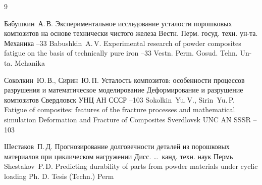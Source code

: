 \begin{thebibliography}{9}

\by Бабушкин~А.\,В.
\paper Экспериментальное исследование усталости порошковых композитов на основе технически чистого железа
\jour Вестн. Перм. госуд. техн. ун-та. Механика
--33
\misctransl
\by Babushkin~A.\,V.
\paper Experimental research of powder composites fatigue on the basis of technically pure iron
--33
\jour Vestn. Perm. Gosud. Tehn. Un-ta. Mehanika

\by Соколкин~Ю.\,В., Сирин~Ю.\,П.
\paper Усталость композитов: особенности процессов разрушения и математическое моделирование
\inbook Деформирование и разрушение композитов
\publaddr Свердловск
\publ УНЦ АН СССР
--103
\misctransl
\by Sokolkin~Yu.\,V., Sirin~Yu.\,P.
\paper Fatigue of composites: features of the fracture processes and mathematical simulation
\inbook Deformation and Fracture of Composites
\publaddr Sverdlovsk
\publ UNC AN SSSR 
--103


\by Шестаков~П.\,Д.
\thesis Прогнозирование долговечности деталей из порошковых материалов при циклическом нагружении
\thesisinfo Дисс. \ldots\ канд. техн. наук
\publaddr Пермь
\misctransl
\by Shestakov~P.\,D.
\thesis Predicting durability of parts from powder materials under cyclic loading
\thesisinfo Ph. D. Tesis (Techn.)
\publaddr Perm

\end{thebibliography}



\noindent
\hskip6.5cm \thedate \par\noindent
\hskip6.5cm\therevdate

\newpage
%
%

\makeengtitlem

\newpage



%
